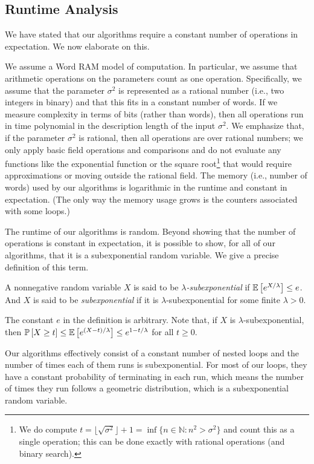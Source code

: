 \documentclass{jpc}
\newcommand{\ex}[2]{{\ifx&#1& \mathbb{E} \else
\underset{#1}{\mathbb{E}} \fi \left[#2\right]}}
\newcommand{\pr}[2]{{\ifx&#1& \mathbb{P} \else
\underset{#1}{\mathbb{P}} \fi \left[#2\right]}}
\begin{document}
\subsection{Runtime Analysis}
\label{ssec:runtime}
We have stated that our algorithms require a constant number of operations in expectation. We now elaborate on this.

We assume a Word RAM model of computation. In particular, we assume that arithmetic operations on the parameters count as one operation. Specifically, we assume that the parameter $\sigma^2$ is represented as a rational number (i.e., two integers in binary) and that this fits in a constant number of words. If we measure complexity in terms of bits (rather than words), then all operations run in time polynomial in the description length of the input $\sigma^2$. We emphasize that, if the parameter $\sigma^2$ is rational, then all operations are over rational numbers; we only apply basic field operations and comparisons and do not evaluate any functions like the exponential function or the square root\footnote{We do compute $t = \lfloor \sqrt{\sigma^2} \rfloor + 1 = \inf\{n \in \mathbb{N} : n^2>\sigma^2\}$ and count this as a single operation; this can be done exactly with rational operations (and binary search).} that would require approximations or moving outside the rational field. The memory (i.e., number of words) used by our algorithms is logarithmic in the runtime and constant in expectation. (The only way the memory usage grows is the counters associated with some loops.)

The runtime of our algorithms is random. Beyond showing that the number of operations is constant in expectation, it is possible to show, for all of our algorithms, that it is a subexponential random variable. We give a precise definition of this term.
\begin{defi}
A nonnegative random variable $X$ is said to be \emph{$\lambda$-subexponential} if $\ex{}{e^{X/\lambda}} \leq e$. And $X$ is said to be \emph{subexponential} if it is $\lambda$-subexponential for some finite $\lambda>0$. \end{defi}
The constant $e$ in the definition is arbitrary. Note that, if $X$ is $\lambda$-subexponential, then $\pr{}{X \ge t} \le \ex{}{e^{(X-t)/\lambda}} \le e^{1-t/\lambda}$ for all $t \ge 0$.

Our algorithms effectively consist of a constant number of nested loops and the number of times each of them runs is subexponential. For most of our loops, they have a constant probability of terminating in each run, which means the number of times they run follows a geometric distribution, which is a subexponential random variable. 
\end{document}
